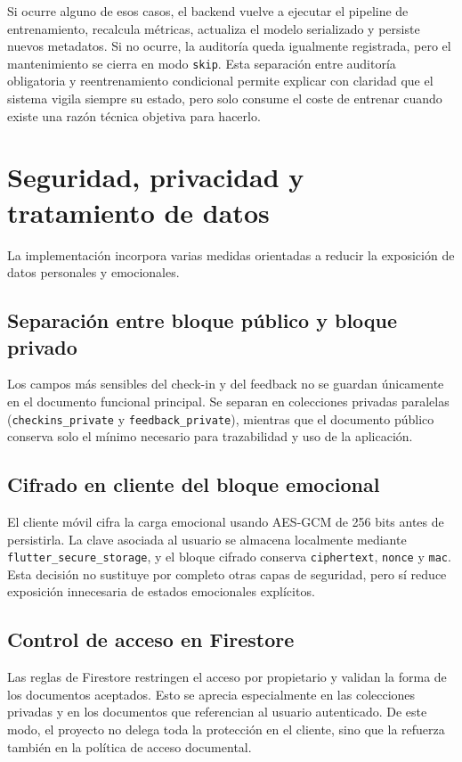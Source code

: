 Si ocurre alguno de esos casos, el backend vuelve a ejecutar el pipeline de
entrenamiento, recalcula métricas, actualiza el modelo serializado y persiste
nuevos metadatos. Si no ocurre, la auditoría queda igualmente registrada, pero
el mantenimiento se cierra en modo \texttt{skip}. Esta separación entre
auditoría obligatoria y reentrenamiento condicional permite explicar con
claridad que el sistema vigila siempre su estado, pero solo consume el coste de
entrenar cuando existe una razón técnica objetiva para hacerlo.

\section{Seguridad, privacidad y tratamiento de datos}
\label{sec:seguridad_privacidad}

La implementación incorpora varias medidas orientadas a reducir la exposición de
datos personales y emocionales.

\subsection{Separación entre bloque público y bloque privado}

Los campos más sensibles del check-in y del feedback no se guardan únicamente en
el documento funcional principal. Se separan en colecciones privadas paralelas
(\texttt{checkins\_private} y \texttt{feedback\_private}), mientras que el
documento público conserva solo el mínimo necesario para trazabilidad y uso de
la aplicación.

\subsection{Cifrado en cliente del bloque emocional}

El cliente móvil cifra la carga emocional usando AES-GCM de 256 bits antes de
persistirla. La clave asociada al usuario se almacena localmente mediante
\texttt{flutter\_secure\_storage}, y el bloque cifrado conserva
\texttt{ciphertext}, \texttt{nonce} y \texttt{mac}. Esta decisión no sustituye
por completo otras capas de seguridad, pero sí reduce exposición innecesaria de
estados emocionales explícitos.

\subsection{Control de acceso en Firestore}

Las reglas de Firestore restringen el acceso por propietario y validan la
forma de los documentos aceptados. Esto se aprecia especialmente en las
colecciones privadas y en los documentos que referencian al usuario autenticado.
De este modo, el proyecto no delega toda la protección en el cliente, sino que
la refuerza también en la política de acceso documental.

